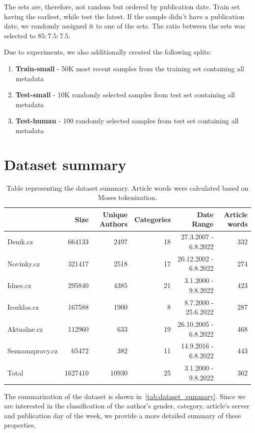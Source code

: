 The sets are, therefore, not random but ordered by publication date. Train set having the earliest, while test the latest.
If the sample didn't have a publication date, we randomly assigned it to one of the sets.
The ratio between the sets was selected to $85:7.5:7.5$.

Due to experiments, we also additionally created the following splits:
\begin{enumerate}
    \item\label{enum:train-small} \textbf{Train-small} - 50K most recent samples from the training set containing all metadata
    \item\label{enum:test-small} \textbf{Test-small} - 10K randomly selected samples from test set containing all metadata
    \item\label{enum:test-human} \textbf{Test-human} - 100 randomly selected samples from test set containing all metadata
\end{enumerate}

\section{Dataset summary}
\begin{table}[h]
    \centering\footnotesize\sf
    \begin{tabular}{lrrrrr}
        \toprule
        {}              & Size    & Unique Authors & Categories & Date Range            & Article words \\
        \midrule
        Denik.cz        & 664133  & 2497           & 18         & 27.3.2007 - 6.8.2022  & 332           \\
        Novinky.cz      & 321417  & 2518           & 17         & 20.12.2002 - 6.8.2022 & 274           \\
        Idnes.cz        & 295840  & 4385           & 21         & 3.1.2000 - 9.8.2022   & 423           \\
        Irozhlas.cz     & 167588  & 1900           & 8          & 8.7.2000 - 25.6.2022  & 287           \\
        Aktualne.cz     & 112960  & 633            & 19         & 26.10.2005 - 6.8.2022 & 468           \\
        Seznamzpravy.cz & 65472   & 382            & 11         & 14.9.2016 - 6.8.2022  & 443           \\
        \midrule
        Total           & 1627410 & 10930          & 25         & 3.1.2000 - 9.8.2022   & 362           \\
        \bottomrule
    \end{tabular}
    \caption{Table representing the dataset summary. Article words were calculated based on Moses tokenization.}
    \label{tab:dataset_summary}
\end{table}
The summarization of the dataset is shown in~\autoref{tab:dataset_summary}.
Since we are interested in the classification of the author's gender, category,
article's server and publication day of the week, we provide a more detailed summary of these properties,

